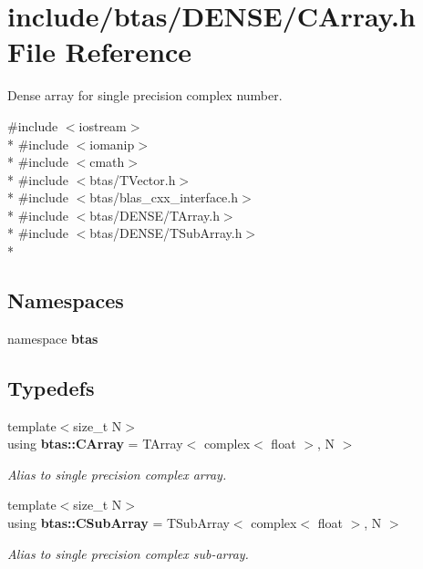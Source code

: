 \section{include/btas/\-D\-E\-N\-S\-E/\-C\-Array.h File Reference}
\label{d9/d78/CArray_8h}


Dense array for single precision complex number.  


{\ttfamily \#include $<$iostream$>$}\\*
{\ttfamily \#include $<$iomanip$>$}\\*
{\ttfamily \#include $<$cmath$>$}\\*
{\ttfamily \#include $<$btas/\-T\-Vector.\-h$>$}\\*
{\ttfamily \#include $<$btas/blas\-\_\-cxx\-\_\-interface.\-h$>$}\\*
{\ttfamily \#include $<$btas/\-D\-E\-N\-S\-E/\-T\-Array.\-h$>$}\\*
{\ttfamily \#include $<$btas/\-D\-E\-N\-S\-E/\-T\-Sub\-Array.\-h$>$}\\*
\subsection*{Namespaces}
\begin{DoxyCompactItemize}
\item 
namespace {\bf btas}
\end{DoxyCompactItemize}
\subsection*{Typedefs}
\begin{DoxyCompactItemize}
\item 
{\footnotesize template$<$size\-\_\-t N$>$ }\\using {\bf btas\-::\-C\-Array} = T\-Array$<$ complex$<$ float $>$, N $>$
\begin{DoxyCompactList}\small\item\em Alias to single precision complex array. \end{DoxyCompactList}\item 
{\footnotesize template$<$size\-\_\-t N$>$ }\\using {\bf btas\-::\-C\-Sub\-Array} = T\-Sub\-Array$<$ complex$<$ float $>$, N $>$
\begin{DoxyCompactList}\small\item\em Alias to single precision complex sub-\/array. \end{DoxyCompactList}\end{DoxyCompactItemize}
